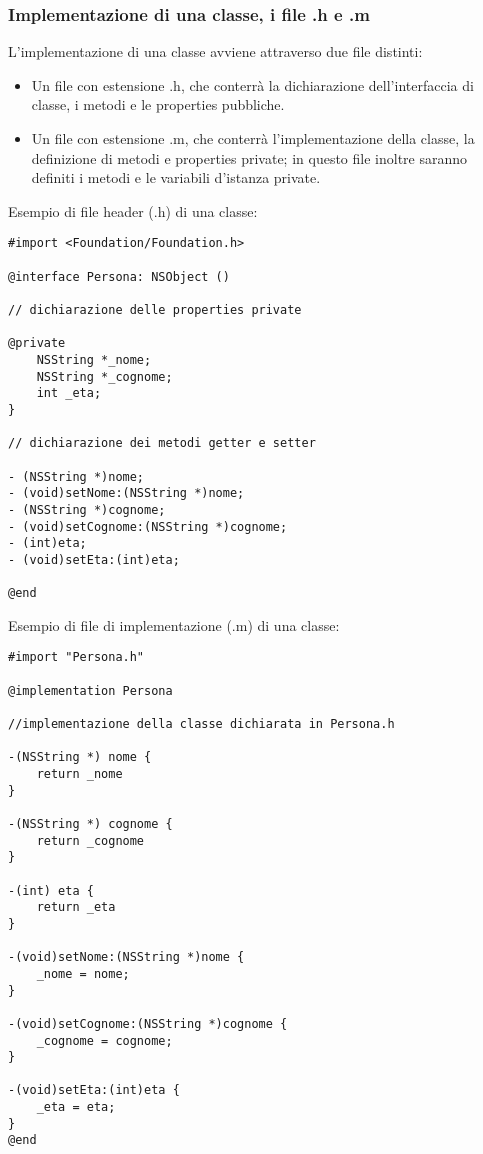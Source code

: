\subsubsection{Implementazione di una classe, i file .h e .m}
L'implementazione di una classe avviene attraverso due file distinti:
\begin{itemize}
\item Un file con estensione .h, che conterrà la dichiarazione dell'interfaccia di classe, i metodi e le properties pubbliche.
\item Un file con estensione .m, che conterrà l'implementazione della classe, la definizione di metodi e properties private; in questo file inoltre saranno definiti i metodi e le variabili d'istanza private.
\end{itemize}
Esempio di file header (.h) di una classe:
\lstset{language=[Objective]C, breakindent=40pt, breaklines}
\begin{lstlisting}
#import <Foundation/Foundation.h>

@interface Persona: NSObject ()

// dichiarazione delle properties private 

@private
	NSString *_nome;
	NSString *_cognome;
	int _eta; 
}

// dichiarazione dei metodi getter e setter

- (NSString *)nome;
- (void)setNome:(NSString *)nome;
- (NSString *)cognome;
- (void)setCognome:(NSString *)cognome;
- (int)eta;
- (void)setEta:(int)eta;

@end
\end{lstlisting}
\bigskip
\bigskip
\bigskip
Esempio di file di implementazione (.m) di una classe:
\lstset{language=[Objective]C, breakindent=40pt, breaklines}
\begin{lstlisting}
#import "Persona.h" 

@implementation Persona

//implementazione della classe dichiarata in Persona.h
 
-(NSString *) nome {
	return _nome
}

-(NSString *) cognome {
	return _cognome
}

-(int) eta {
	return _eta
}

-(void)setNome:(NSString *)nome {
	_nome = nome;
}

-(void)setCognome:(NSString *)cognome {
	_cognome = cognome;
}

-(void)setEta:(int)eta {
	_eta = eta;
}
@end
\end{lstlisting}
